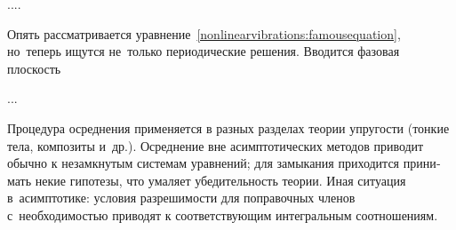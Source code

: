 ....




\begin{otherlanguage}{russian}

Опять рассматривается уравнение~\eqref{nonlinearvibrations:famousequation}, но~теперь ищутся не~только периодические решения.
Вводится фазовая плоскость

...

Процедура осреднения применяется в разных разделах теории упругости (тонкие тела, композиты и~др.).
Осреднение вне асимптотических методов приводит обычно к незамкнутым системам уравнений; для замыкания приходится принимать некие гипотезы, что умаляет убедительность теории.
Иная ситуация в~асимптотике: условия разрешимости для поправочных членов с~необходимостью приводят к соответствующим интегральным соотношениям.

\end{otherlanguage}



